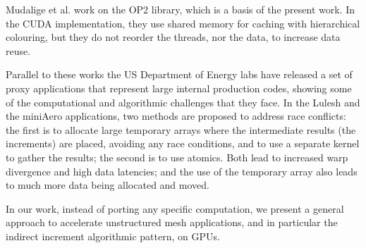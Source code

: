 Mudalige et al. \cite{op2} work on the OP2 library, which is a basis of the
present work. In the CUDA implementation, they use shared memory for caching
with hierarchical colouring, but they do not reorder the threads, nor the data,
to increase data reuse.

Parallel to these works the US Department of Energy labs have released a set of
proxy applications that represent large internal production codes, showing some
of the computational and algorithmic challenges that they face. In the Lulesh
\cite{LULESH2:changes} and the miniAero \cite{miniaero} applications, two
methods are proposed to address race conflicts: the first is to allocate large
temporary arrays where the intermediate results (the increments) are placed,
avoiding any race conditions, and to use a separate kernel to gather the
results; the second is to use atomics. Both lead to increased warp divergence
and high data latencies; and the use of the temporary array also leads to much
more data being allocated and moved.

In our work, instead of porting any specific computation, we present a general
approach to accelerate unstructured mesh applications, and in particular the
indirect increment algorithmic pattern, on GPUs.
